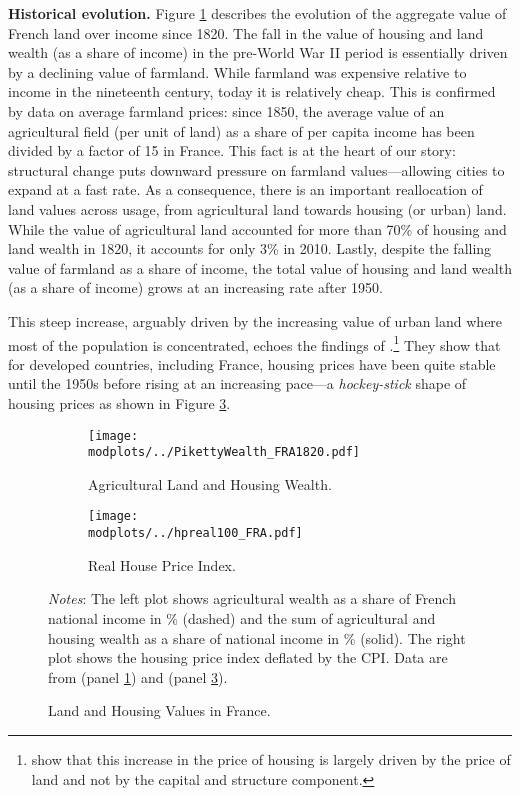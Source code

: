 \documentclass[./20250130-paper.tex]{subfiles}
\begin{document}
\textbf{Historical evolution.} Figure \ref{fig:pikettywealth} describes the evolution of the aggregate value of French land over income since 1820. The fall in the value of housing and land wealth (as a share of income) in the pre-World War II period is essentially driven by a declining value of farmland. While farmland was expensive relative to income in the nineteenth century, today it is relatively cheap. This is confirmed by data on average farmland prices: since 1850, the average value of an agricultural field (per unit of land) as a share of per capita income has been divided by a factor of 15 in France. This fact is at the heart of our story: structural change puts downward pressure on farmland values---allowing cities to expand at a fast rate. As a consequence, there is an important reallocation of land values across usage, from agricultural land towards housing (or urban) land. While the value of agricultural land accounted for more than 70\% of housing and land wealth in 1820, it accounts for only 3\% in 2010. Lastly, despite the falling value of farmland as a share of income, the total value of housing and land wealth (as a share of income) grows at an increasing rate after 1950. 



This steep increase, arguably driven by the increasing value of urban land where most of the population is concentrated, echoes the findings of \cite{knoll2017no}.\footnote{\cite{bonnet2019} show that this increase in the price of housing is largely driven by the price of land and not by the capital and structure component.} They show that for developed countries, including France, housing prices have been quite stable until the 1950s before rising at an increasing pace---a \emph{hockey-stick} shape of housing prices as shown in Figure \ref{fig:real-hpi-knoll}.



\begin{figure}[h]
	\begin{subfigure}{0.5\textwidth}
		\texttt{[image: \\modplots/../PikettyWealth\_FRA1820.pdf]}
		\caption{Agricultural Land and Housing Wealth.\label{fig:pikettywealth}}
	\end{subfigure}%
	\hspace{5mm}
	\begin{subfigure}{0.5\textwidth}
		\texttt{[image: \\modplots/../hpreal100\_FRA.pdf]}
		\caption{Real House Price Index.\label{fig:real-hpi-knoll}}
	\end{subfigure}
	\caption{Land and Housing Values in France.}
	{\footnotesize \textit{Notes}: The left plot shows agricultural wealth as a share of French national income in \% (dashed) and the sum of agricultural and housing wealth as a share of national income in \% (solid). The right plot shows the housing price index deflated by the CPI. Data are from \cite{piketty2014capital} (panel \ref{fig:pikettywealth}) and \cite{knoll2017no} (panel \ref{fig:real-hpi-knoll}).}
\end{figure}
\end{document}
